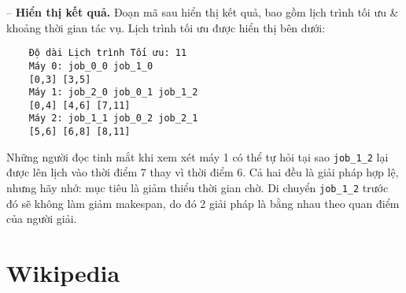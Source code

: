 \documentclass{article}
\begin{document}
-- {\bf Hiển thị kết quả.} Đoạn mã sau hiển thị kết quả, bao gồm lịch trình tối ưu \& khoảng thời gian tác vụ. Lịch trình tối ưu được hiển thị bên dưới:
\begin{verbatim}
    Độ dài Lịch trình Tối ưu: 11
    Máy 0: job_0_0 job_1_0
    [0,3] [3,5]
    Máy 1: job_2_0 job_0_1 job_1_2
    [0,4] [4,6] [7,11]
    Máy 2: job_1_1 job_0_2 job_2_1
    [5,6] [6,8] [8,11]
\end{verbatim}
Những người đọc tinh mắt khi xem xét máy 1 có thể tự hỏi tại sao \verb|job_1_2| lại được lên lịch vào thời điểm 7 thay vì thời điểm 6. Cả hai đều là giải pháp hợp lệ, nhưng hãy nhớ: mục tiêu là giảm thiểu thời gian chờ. Di chuyển \verb|job_1_2| trước đó sẽ không làm giảm makespan, do đó 2 giải pháp là bằng nhau theo quan điểm của người giải.


\section{Wikipedia}
\end{document}
